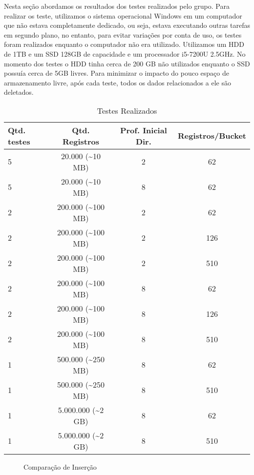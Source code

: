 Nesta seção abordamos os resultados dos testes realizados pelo grupo. Para realizar os teste, utilizamos o sistema operacional Windows em um computador que não estava completamente dedicado, ou seja, estava executando outras tarefas em segundo plano, no entanto, para evitar variações por conta de uso, os testes foram realizados enquanto o computador não era utilizado. Utilizamos um HDD de 1TB e um SSD 128GB de capacidade e um processador i5-7200U 2.5GHz. No momento dos testes o HDD tinha cerca de 200 GB não utilizados enquanto o SSD possuía cerca de 5GB livres. Para minimizar o impacto do pouco espaço de armazenamento livre, após cada teste, todos os dados relacionados a ele são deletados.

\begin{table}[htbp]
	\centering
	\caption{\hspace{0.1cm} Testes Realizados }
	\vspace{-0.3cm} %
	\label{tstRealiazdos}
	\begin{tabular}{l|c|c|c}
  \hline
    \textbf{Qtd. testes}	& \textbf{Qtd. Registros} & \textbf{Prof. Inicial Dir.} & \textbf{Registros/Bucket} \\
    \hline
     5 & 20.000 (\textasciitilde10 MB) & 2 & 62 \\
     5 & 20.000 (\textasciitilde10 MB) & 8 & 62 \\
     2 & 200.000 (\textasciitilde100 MB) & 2 & 62 \\
     2 & 200.000 (\textasciitilde100 MB) & 2 & 126 \\
     2 & 200.000 (\textasciitilde100 MB) & 2 & 510 \\
     2 & 200.000 (\textasciitilde100 MB) & 8 & 62 \\
     2 & 200.000 (\textasciitilde100 MB) & 8 & 126 \\
     2 & 200.000 (\textasciitilde100 MB) & 8 & 510 \\
     1 & 500.000 (\textasciitilde250 MB) & 8 & 62 \\
     1 & 500.000 (\textasciitilde250 MB) & 8 & 510 \\
     1 & 5.000.000 (\textasciitilde2 GB) & 8 & 62 \\
     1 & 5.000.000 (\textasciitilde2 GB) & 8 & 510 \\
     \hline
 \end{tabular}
\end{table}

\begin{figure}[htbp]
  \centering
  
  \caption{Comparação de Inserção}
  \label{cmp:insercao}
\end{figure}

